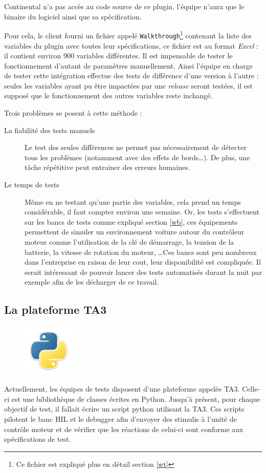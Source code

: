 	\begin{remarque}
		Continental n'a pas accès au code source de ce plugin, l'équipe n'aura que le binaire du logiciel ainsi que sa spécification.	
	\end{remarque}
	
	Pour cela, le client fourni un fichier appelé \texttt{Walkthrough}\footnote{Ce fichier est expliqué plus en détail section \ref{wt}}
	contenant la liste des variables du plugin avec toutes leur spécifications, ce fichier est au format \textit{Excel} : il contient
	environ 900 variables différentes. Il est impensable de tester le fonctionnement d'autant de paramètres manuellement. Ainsi l'équipe en
	charge de tester cette intégration effectue des tests de différence d'une version à l'autre : seules les variables ayant pu être
	impactées par une \textit{release} seront testées, il est supposé que le fonctionnement des autres variables reste inchangé.

	Trois problèmes se posent à cette méthode : 
	\begin{description}
		\item[La fiabilité des tests manuels] Le test des seules différences ne permet pas nécessairement de détecter tous les problèmes (notamment avec des effets de bords\ldots). De plus, une tâche répétitive peut entrainer des erreurs humaines.
		\item[Le temps de tests] Même en ne testant qu'une partie des variables, cela prend un temps considérable, il faut compter environ une semaine.\newline
			Or, les tests s'effectuent sur les bancs de tests comme expliqué section \ref{wb}, ces équipements permettent de simuler un environnement voiture autour du contrôleur moteur comme
			l'utilisation de la clé de démarrage, la tension de la batterie, la vitesse de rotation du moteur, \ldots Ces bancs sont peu
			nombreux dans l'entreprise en raison de leur cout, leur disponibilité est compliquée. Il serait intéressant de pouvoir lancer
			des tests automatisés durant la nuit par exemple afin de les décharger de ce travail.
	\end{description}

	\subsection{La plateforme TA3}\label{ta3}
\begin{figure}
	\includegraphics[width=2.5cm]{contents/images/python.png}
\end{figure}
	Actuellement, les équipes de tests disposent d'une plateforme appelée TA3. Celle-ci est une bibliothèque de classes écrites en Python. Jusqu'à présent, pour chaque objectif de test, il fallait écrire un script python utilisant la TA3. Ces scripts pilotent le banc HIL et le debugger afin d'envoyer des stimulis à l'unité de contrôle moteur et de vérifier que les réactions de celui-ci sont conforme aux spécifications de test.

